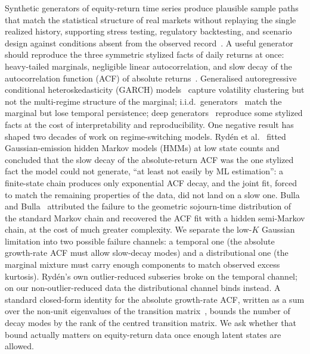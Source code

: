 Synthetic generators of equity-return time series produce plausible sample paths that match the statistical structure of real markets without replaying the single realized history, supporting stress testing, regulatory backtesting, and scenario design against conditions absent from the observed record~\cite{assefa2020generating}. A useful generator should reproduce the three symmetric stylized facts of daily returns at once: heavy-tailed marginals, negligible linear autocorrelation, and slow decay of the autocorrelation function (ACF) of absolute returns~\cite{mandelbrot1963variation, cont2001empirical}. Generalised autoregressive conditional heteroskedasticity (GARCH) models~\cite{engle1982autoregressive, bollerslev1986generalized} capture volatility clustering but not the multi-regime structure of the marginal; i.i.d.\ generators~\cite{efron1979bootstrap} match the marginal but lose temporal persistence; deep generators~\cite{yoon2019timegan, wiese2020quantgan} reproduce some stylized facts at the cost of interpretability and reproducibility. One negative result has shaped two decades of work on regime-switching models. Ryd\'{e}n et al.~\cite{ryden1998stylized} fitted Gaussian-emission hidden Markov models (HMMs) at low state counts and concluded that the slow decay of the absolute-return ACF was the one stylized fact the model could not generate, ``at least not easily by ML estimation'': a finite-state chain produces only exponential ACF decay, and the joint fit, forced to match the remaining properties of the data, did not land on a slow one. Bulla and Bulla~\cite{bulla2006stylized} attributed the failure to the geometric sojourn-time distribution of the standard Markov chain and recovered the ACF fit with a hidden semi-Markov chain, at the cost of much greater complexity. We separate the low-$K$ Gaussian limitation into two possible failure channels: a temporal one (the absolute growth-rate ACF must allow slow-decay modes) and a distributional one (the marginal mixture must carry enough components to match observed excess kurtosis). Ryd\'{e}n's own outlier-reduced subseries broke on the temporal channel; on our non-outlier-reduced data the distributional channel binds instead. A standard closed-form identity for the absolute growth-rate ACF, written as a sum over the non-unit eigenvalues of the transition matrix~\cite{hamilton1994time, timmermann2000moments}, bounds the number of decay modes by the rank of the centred transition matrix. We ask whether that bound actually matters on equity-return data once enough latent states are allowed.

